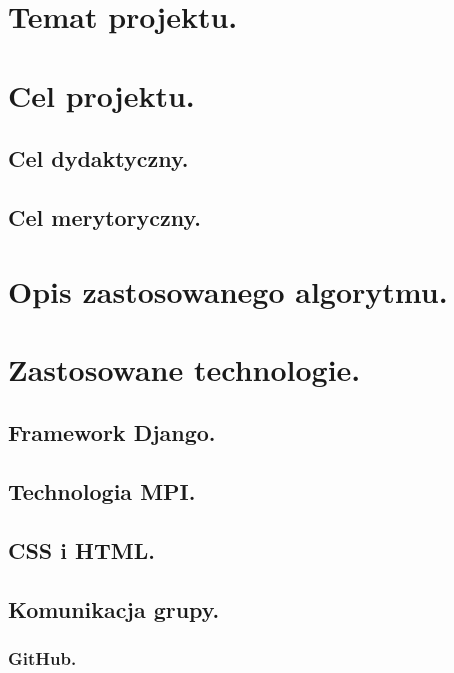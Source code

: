 \documentclass[a4paper,12pt]{article}		%
\begin{document}

\newpage
\tableofcontents
\newpage


\section{Temat projektu.}
\section{Cel projektu.}
\subsection{Cel dydaktyczny.}
\subsection{Cel merytoryczny.}
\section{Opis zastosowanego algorytmu.}
\section{Zastosowane technologie.}
\subsection{Framework Django.}
\subsection{Technologia MPI.}
\subsection{CSS i HTML.}
\subsection{Komunikacja grupy.}
\subsubsection{GitHub.}
\end{document}
